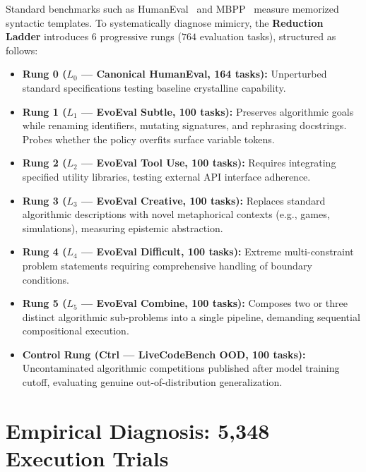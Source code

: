 \documentclass[10pt,twocolumn,letterpaper]{article}
\begin{document}
Standard benchmarks such as HumanEval~\cite{humaneval} and MBPP~\cite{mbpp} measure memorized syntactic templates. To systematically diagnose mimicry, the \textbf{Reduction Ladder} introduces 6 progressive rungs ($764$ evaluation tasks), structured as follows:

\begin{itemize}[leftmargin=*]
    \item \textbf{Rung 0 ($L_0$ --- Canonical HumanEval, 164 tasks):} Unperturbed standard specifications testing baseline crystalline capability.
    \item \textbf{Rung 1 ($L_1$ --- EvoEval Subtle, 100 tasks):} Preserves algorithmic goals while renaming identifiers, mutating signatures, and rephrasing docstrings. Probes whether the policy overfits surface variable tokens.
    \item \textbf{Rung 2 ($L_2$ --- EvoEval Tool Use, 100 tasks):} Requires integrating specified utility libraries, testing external API interface adherence.
    \item \textbf{Rung 3 ($L_3$ --- EvoEval Creative, 100 tasks):} Replaces standard algorithmic descriptions with novel metaphorical contexts (e.g., games, simulations), measuring epistemic abstraction.
    \item \textbf{Rung 4 ($L_4$ --- EvoEval Difficult, 100 tasks):} Extreme multi-constraint problem statements requiring comprehensive handling of boundary conditions.
    \item \textbf{Rung 5 ($L_5$ --- EvoEval Combine, 100 tasks):} Composes two or three distinct algorithmic sub-problems into a single pipeline, demanding sequential compositional execution.
    \item \textbf{Control Rung (Ctrl --- LiveCodeBench OOD, 100 tasks):} Uncontaminated algorithmic competitions published after model training cutoff, evaluating genuine out-of-distribution generalization.
\end{itemize}

\section{Empirical Diagnosis: 5,348 Execution Trials}
\label{sec:empirical}
\end{document}
